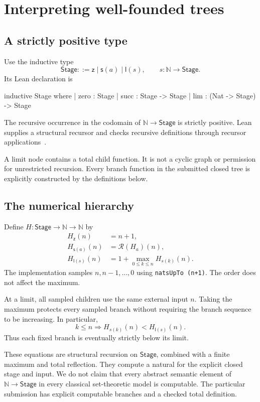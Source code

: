 \documentclass[11pt,letterpaper]{article}
\theoremstyle{definition}
\newcommand{\N}{\mathbb N}
\newcommand{\W}{\mathsf{Stage}}
\newcommand{\Z}{\mathsf z}
\newcommand{\Suc}{\mathsf s}
\newcommand{\Lim}{\mathsf l}
\newcommand{\RF}{\mathcal R}
\newcommand{\code}[1]{\texttt{#1}}
\begin{document}
\section{Interpreting well-founded trees}\label{sec:hierarchy}
\subsection{A strictly positive type}
Use the inductive type
\[
              \W ::= \Z\mid\Suc(a)\mid\Lim(s),\qquad s:\N\to\W.
\]
Its Lean declaration is
\begin{LeanCode}
inductive Stage where
  | zero : Stage
  | succ : Stage -> Stage
  | lim : (Nat -> Stage) -> Stage
\end{LeanCode}
The recursive occurrence in the codomain of \(\N\to\W\) is strictly positive.
Lean supplies a structural recursor and checks recursive definitions
through recursor applications~\cite{lean-inductive}.

A limit node contains a total child function. It is not a cyclic graph
or permission for unrestricted recursion. Every branch function in the
submitted closed tree is explicitly constructed by the definitions below.

\subsection{The numerical hierarchy}
Define \(H:\W\to\N\to\N\) by
\begin{align}
 H_{\Z}(n)&=n+1,\label{eq:hz}\\
 H_{\Suc(a)}(n)&=\RF(H_a)(n),\label{eq:hs}\\
 H_{\Lim(s)}(n)&=1+\max_{0\le k\le n}H_{s(k)}(n).\label{eq:hl}
\end{align}
The implementation samples \(n,n-1,\ldots,0\) using
\code{natsUpTo (n+1)}. The order does not affect the maximum.

At a limit, all sampled children use the same external input \(n\).
Taking the maximum protects every sampled branch without requiring
the branch sequence to be increasing. In particular,
\[
                k\le n\Longrightarrow H_{s(k)}(n)<H_{\Lim(s)}(n).
\]
Thus each fixed branch is eventually strictly below its limit.

These equations are structural recursion on \(\W\), combined with a
finite maximum and total reflection. They compute a natural for the
explicit closed stage and input. We do not claim that every abstract
semantic element of \(\N\to\W\) in every classical set-theoretic model
is computable. The particular submission has explicit computable
branches and a checked total definition.
\end{document}
